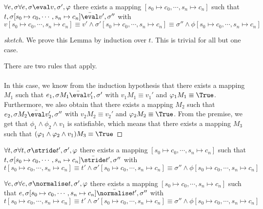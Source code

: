 \begin{lemma}
  $\forall e,\sigma \forall e,\sigma\eval v,\sigma',\phi$
  there exists a mapping $[s_0\mapsto c_0,\cdots,s_n\mapsto c_n]$
  such that $t,\sigma [s_0\mapsto c_0,\cdots,s_n\mapsto c_n] \bar{\eval}v',\sigma''$
  with $v[s_0\mapsto c_0,\cdots,s_n\mapsto c_n] \equiv v' \wedge \sigma' [s_0\mapsto c_0,\cdots,s_n\mapsto c_n] \equiv \sigma'' \wedge \phi [s_0\mapsto c_0,\cdots,s_n\mapsto c_n]$
\end{lemma}

\begin{proof}[sketch]
  We prove this Lemma by induction over $t$. This is trivial for all but one case.

       {There are two rules that apply.\\
       \\
       In this case, we know from the induction hypothesis that there exists a mapping $M_1$ such that $e_1,\sigma M_1 \bar{\eval}v_1',\sigma'$ with $v_1 M_1\equiv v_1'$ and $\phi_1 M_1\equiv\True$.
       Furthermore, we also obtain that there exists a mapping $M_2$ such that $e_2,\sigma M_2 \bar{\eval}v_2',\sigma''$ with $v_2 M_2\equiv v_2'$ and $\phi_2 M_2\equiv\True$.
       From the premise, we get that $\phi_1\wedge\phi_2\wedge v_1$ is satisfiable, which means that there exists a mapping $M_3$ such that $(\phi_1\wedge\phi_2\wedge v_1)M_3\equiv\True$}
\end{proof}

\begin{lemma}
  $\forall t,\sigma \forall t,\sigma\stride t',\sigma',\phi$
  there exists a mapping $[s_0\mapsto c_0,\cdots,s_n\mapsto c_n]$
  such that $t,\sigma [s_0\mapsto c_0,\cdots,s_n\mapsto c_n] \bar{\stride}t',\sigma''$
  with $t[s_0\mapsto c_0,\cdots,s_n\mapsto c_n] \equiv t' \wedge \sigma' [s_0\mapsto c_0,\cdots,s_n\mapsto c_n] \equiv \sigma'' \wedge \phi [s_0\mapsto c_0,\cdots,s_n\mapsto c_n]$
\end{lemma}

\begin{lemma}
  $\forall e,\sigma \forall e,\sigma\normalise t,\sigma',\phi$
  there exists a mapping $[s_0\mapsto c_0,\cdots,s_n\mapsto c_n]$
  such that $e,\sigma [s_0\mapsto c_0,\cdots,s_n\mapsto c_n] \bar{\normalise}t',\sigma''$
  with $t[s_0\mapsto c_0,\cdots,s_n\mapsto c_n] \equiv t' \wedge \sigma' [s_0\mapsto c_0,\cdots,s_n\mapsto c_n] \equiv \sigma'' \wedge \phi [s_0\mapsto c_0,\cdots,s_n\mapsto c_n]$
\end{lemma}

